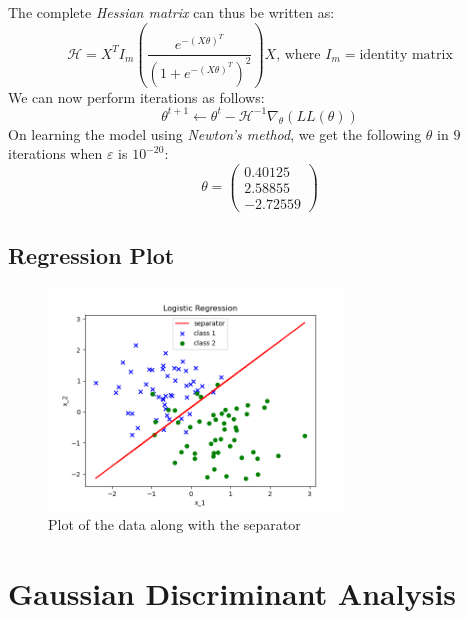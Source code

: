 \documentclass[11pt]{article}
\begin{document}
The complete \textit{Hessian matrix} can thus be written as:
\begin{equation}
    \mathcal{H} = X^T I_m \left(\frac{e^{-(X\theta)^T}}{\left(1+e^{-(X\theta)^T}\right)^2}\right) X\text{, where }I_m=\text{identity matrix} %
\end{equation}
We can now perform iterations as follows:
\begin{equation}
    \theta^{t+1}\gets\theta^t-\mathcal{H}^{-1}\nabla_\theta(LL(\theta))
\end{equation}
On learning the model using \textit{Newton's method}, we get the following $\theta$ in $9$ iterations when $\varepsilon$ is $10^{-20}$:
\begin{equation}
    \theta =
    \begin{pmatrix}
        0.40125\\
        2.58855\\
        -2.72559
    \end{pmatrix}
\end{equation}

\subsection{Regression Plot}
\begin{figure}[H]
    \centering
    \includegraphics[width=0.7\textwidth]{Q3/output/b.png}
    \caption{Plot of the data along with the separator}
\end{figure}


\section{Gaussian Discriminant Analysis}
\end{document}

